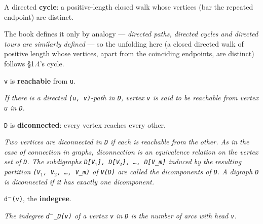 \begin{definition}
\label{Digraph.IsDirectedCycle}
\leanok
{}
A directed \textbf{cycle}: a positive-length closed walk whose vertices (bar the
repeated endpoint)
are distinct.

The book defines it only by analogy --- \emph{directed
paths, directed cycles and directed tours are similarly defined} --- so the unfolding
here (a closed directed walk of positive length whose vertices, apart from the
coinciding endpoints, are distinct) follows \S{}1.4's cycle.
\end{definition}

\begin{definition}
\label{Digraph.Reachable}
\leanok
\texttt{v} is \textbf{reachable} from \texttt{u}.

\emph{If there is a directed \texttt{(u, v)}-path in
\texttt{D}, vertex \texttt{v} is said to be reachable from vertex \texttt{u} in \texttt{D}.}
\end{definition}

\begin{definition}
\label{Digraph.Diconnected}
\leanok
{}
\texttt{D} is \textbf{diconnected}: every vertex reaches every other.

\emph{Two vertices are diconnected in \texttt{D} if
each is reachable from the other.  As in the case of connection in graphs,
diconnection is an equivalence relation on the vertex set of \texttt{D}. The subdigraphs
\texttt{D[V$_{1}$], D[V$_{2}$], \dots{}, D[V\_m]} induced by the resulting partition \texttt{(V$_{1}$, V$_{2}$, \dots{}, V\_m)} of
\texttt{V(D)} are called the dicomponents of \texttt{D}.  A digraph \texttt{D} is diconnected if it has
exactly one dicomponent.}
\end{definition}

\begin{definition}
\label{Digraph.indegree}
\leanok
\texttt{d$^{-}$(v)}, the \textbf{indegree}.

\emph{The indegree \texttt{d$^{-}$\_D(v)} of a vertex \texttt{v}
in \texttt{D} is the number of arcs with head \texttt{v}.}
\end{definition}

